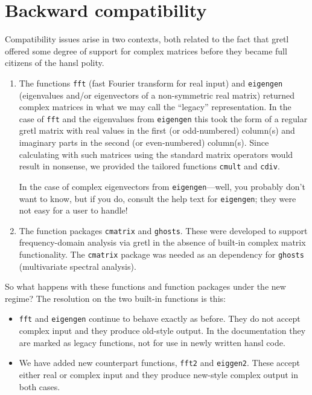 \section{Backward compatibility}
\label{sec:cmplx-compat}

Compatibility issues arise in two contexts, both related to the fact
that gretl offered some degree of support for complex matrices before
they became full citizens of the hansl polity.

\begin{enumerate}
\item The functions \texttt{fft} (fast Fourier transform for real
  input) and \texttt{eigengen} (eigenvalues and/or eigenvectors of a
  non-symmetric real matrix) returned complex matrices in what we may
  call the ``legacy'' representation. In the case of \texttt{fft} and
  the eigenvalues from \texttt{eigengen} this took the form of a
  regular gretl matrix with real values in the first (or odd-numbered)
  column(s) and imaginary parts in the second (or even-numbered)
  column(s). Since calculating with such matrices using the standard
  matrix operators would result in nonsense, we provided the tailored
  functions \texttt{cmult} and \texttt{cdiv}.

  In the case of complex eigenvectors from \texttt{eigengen}---well,
  you probably don't want to know, but if you do, consult the help text
  for \texttt{eigengen}; they were not easy for a user to handle!
\item The function packages \texttt{cmatrix} and
  \texttt{ghosts}. These were developed to support frequency-domain
  analysis via gretl in the absence of built-in complex matrix
  functionality. The \texttt{cmatrix} package was needed as an
  dependency for \texttt{ghosts} (multivariate spectral analysis).
\end{enumerate}

So what happens with these functions and function packages under the
new regime? The resolution on the two built-in functions is this:
\begin{itemize}
\item \texttt{fft} and \texttt{eigengen} continue to behave exactly as
  before. They do not accept complex input and they produce old-style
  output. In the documentation they are marked as legacy functions,
  not for use in newly written hansl code.
\item We have added new counterpart functions, \texttt{fft2} and
  \texttt{eiggen2}. These accept either real or complex input and they
  produce new-style complex output in both cases.
\end{itemize}

